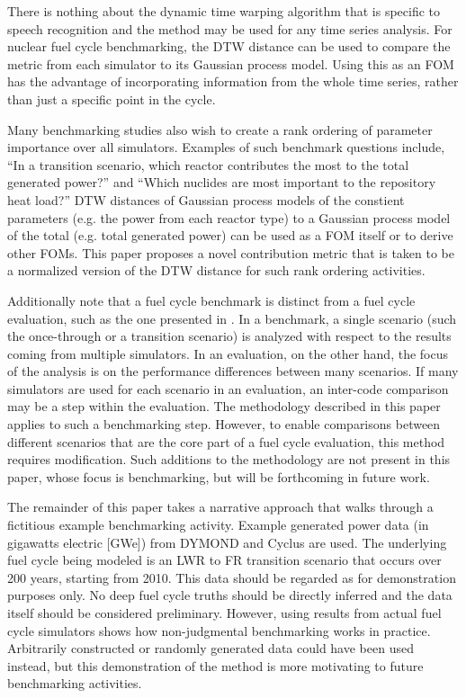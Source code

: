There is nothing about the dynamic time warping algorithm that is specific 
to speech recognition and the method
may be used for any time series analysis. For nuclear fuel cycle benchmarking,
the DTW distance can be used to compare the metric from each simulator to its
Gaussian process model. Using this as an FOM has the advantage of 
incorporating information from the whole time series, rather than just a 
specific point in the cycle.

Many benchmarking studies also wish to create a rank ordering of parameter
importance over all simulators. Examples of such benchmark questions include, 
``In a transition scenario,
which reactor contributes the most to the total generated power?'' and 
``Which
nuclides are most important to the repository heat load?'' DTW distances 
of Gaussian process models of the constient parameters (e.g. the power from
each reactor type) to a Gaussian process model of the total (e.g. total 
generated power) can be used as a FOM itself or to derive other FOMs. 
This paper proposes a novel contribution metric
that is taken to be a normalized version of the DTW 
distance for such rank ordering activities.

Additionally note that a fuel cycle benchmark is distinct from a 
fuel cycle evaluation, such as the one presented in \cite{wigeland2014nuclear}.
In a benchmark, a single scenario (such the once-through or a transition 
scenario) is analyzed with respect to the results coming from multiple 
simulators. In an evaluation, on the other hand, the focus of the analysis
is on the performance differences between many scenarios. If many simulators
are used for each scenario in an evaluation, an inter-code comparison may 
be a step within the evaluation. The methodology described in this paper
applies to such a benchmarking step. However, to enable comparisons
between different scenarios that are the core part of a fuel cycle evaluation,
this method requires modification. Such additions to the methodology 
are not present in this paper, whose focus is benchmarking, but will
be forthcoming in future work. 

The remainder of this paper takes a narrative approach that walks through 
a fictitious example benchmarking activity. Example generated power data 
(in gigawatts electric [GWe]) 
from DYMOND \cite{yacout2005modeling,feng2015dymond} and Cyclus 
\cite{DBLP:journals/corr/HuffGCFMOSSW15,cyclus_v1_0} are used. 
The underlying fuel cycle being modeled is an
LWR to FR transition scenario that occurs over 200 years, starting from 2010.  
This data should be regarded as for demonstration purposes only. No deep
fuel cycle truths should be directly inferred and the data itself should be 
considered preliminary. However, 
using results from actual fuel cycle simulators shows how
non-judgmental benchmarking works in practice. Arbitrarily constructed 
or randomly generated data could 
have been used instead, but this demonstration of the method is more 
motivating to future benchmarking activities.

